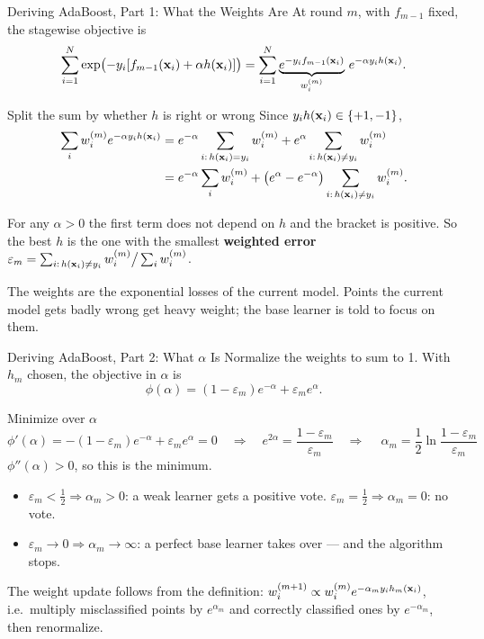 \documentclass[11pt,aspectratio=169]{beamer}
\begin{document}
\begin{frame}{Deriving AdaBoost, Part 1: What the Weights Are}\footnotesize
At round $m$, with $f_{m-1}$ fixed, the stagewise objective is
\[
\sum_{i=1}^N\exp\bigl(-y_i[f_{m-1}(\mathbf{x}_i)+\alpha h(\mathbf{x}_i)]\bigr)
=\sum_{i=1}^N\underbrace{e^{-y_if_{m-1}(\mathbf{x}_i)}}_{w_i^{(m)}}\,e^{-\alpha y_ih(\mathbf{x}_i)} .
\]
\begin{derivation}{Split the sum by whether $h$ is right or wrong}
Since $y_ih(\mathbf{x}_i)\in\{+1,-1\}$,
\begin{align*}
\sum_iw_i^{(m)}e^{-\alpha y_ih(\mathbf{x}_i)}
&=e^{-\alpha}\sum_{i:\,h(\mathbf{x}_i)=y_i}w_i^{(m)}+e^{\alpha}\sum_{i:\,h(\mathbf{x}_i)\ne y_i}w_i^{(m)}\\
&=e^{-\alpha}\sum_iw_i^{(m)}+\bigl(e^{\alpha}-e^{-\alpha}\bigr)\sum_{i:\,h(\mathbf{x}_i)\ne y_i}w_i^{(m)} .
\end{align*}
\end{derivation}
For any $\alpha>0$ the first term does not depend on $h$ and the bracket is positive. So the best $h$ is the
one with the smallest \textbf{weighted error} $\varepsilon_m=\sum_{i:\,h(\mathbf{x}_i)\ne y_i}w_i^{(m)}\big/\sum_iw_i^{(m)}$.
\begin{keypoint}
The weights are the exponential losses of the current model. Points the current model gets badly wrong get
heavy weight; the base learner is told to focus on them.
\end{keypoint}
\end{frame}

\begin{frame}{Deriving AdaBoost, Part 2: What $\alpha$ Is}
Normalize the weights to sum to 1. With $h_m$ chosen, the objective in $\alpha$ is
\[
\phi(\alpha)=(1-\varepsilon_m)e^{-\alpha}+\varepsilon_me^{\alpha}.
\]
\begin{derivation}{Minimize over $\alpha$}
\[
\phi'(\alpha)=-(1-\varepsilon_m)e^{-\alpha}+\varepsilon_me^{\alpha}=0
\quad\Longrightarrow\quad
e^{2\alpha}=\frac{1-\varepsilon_m}{\varepsilon_m}
\quad\Longrightarrow\quad
\boxed{\ \alpha_m=\frac12\ln\frac{1-\varepsilon_m}{\varepsilon_m}\ }
\]
$\phi''(\alpha)>0$, so this is the minimum.
\end{derivation}
\begin{itemize}
  \item $\varepsilon_m<\tfrac12\Rightarrow\alpha_m>0$: a weak learner gets a positive vote. $\varepsilon_m=\tfrac12\Rightarrow\alpha_m=0$: no vote.
  \item $\varepsilon_m\to0\Rightarrow\alpha_m\to\infty$: a perfect base learner takes over --- and the algorithm stops.
\end{itemize}
The weight update follows from the definition: $w_i^{(m+1)}\propto w_i^{(m)}e^{-\alpha_my_ih_m(\mathbf{x}_i)}$, i.e.\ multiply
misclassified points by $e^{\alpha_m}$ and correctly classified ones by $e^{-\alpha_m}$, then renormalize.
\end{frame}
\end{document}
